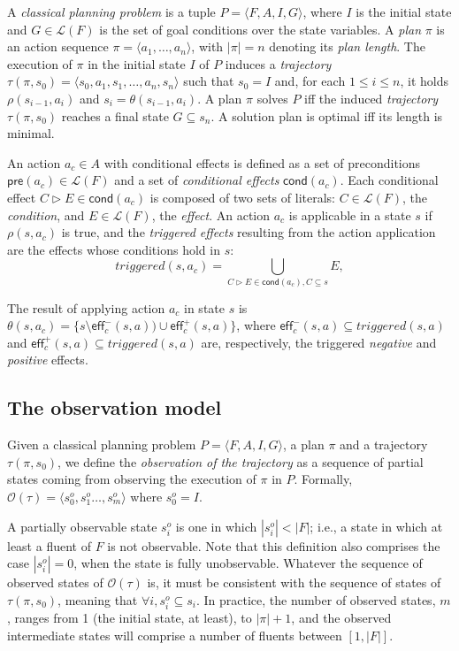 \documentclass{article}
\newcommand{\tup}[1]{{\langle #1 \rangle}}
\newcommand{\pre}{\mathsf{pre}}     %
\newcommand{\eff}{\mathsf{eff}}     %
\newcommand{\cond}{\mathsf{cond}}   %
\begin{document}
A {\em classical planning problem} is a tuple $P=\tup{F,A,I,G}$, where $I$ is the initial state and $G\in\mathcal{L}(F)$ is the set of goal conditions over the state variables. A {\em plan} $\pi$ is an action sequence $\pi=\tup{a_1, \ldots, a_n}$, with $|\pi|=n$ denoting its {\em plan length}. The execution of $\pi$ in the initial state $I$ of $P$ induces a {\em trajectory} $\tau(\pi,s_0)=\tup{s_0, a_1, s_1, \ldots, a_n, s_n}$ such that $s_0=I$ and, for each {\small $1\leq i\leq n$}, it holds $\rho(s_{i-1},a_i)$ and $s_i=\theta(s_{i-1},a_i)$. A plan $\pi$ solves $P$ iff the induced {\em trajectory} $\tau(\pi,s_0)$ reaches a final state $G \subseteq s_n$. A solution plan is optimal iff its length is minimal.

An action $a_c\in A$ with conditional effects is defined as a set of preconditions $\pre(a_c)\in\mathcal{L}(F)$ and a set of {\em conditional effects} $\cond(a_c)$. Each conditional effect $C\rhd E\in\cond(a_c)$ is composed of two sets of literals: $C\in\mathcal{L}(F)$, the {\em condition}, and $E\in\mathcal{L}(F)$, the {\em effect}. An action $a_c$ is applicable in a state $s$ if $\rho(s,a_c)$ is true, and the {\em triggered effects} resulting from the action application are the effects whose conditions hold in $s$:
\[
triggered(s,a_c)=\bigcup_{C\rhd E\in\cond(a_c),C\subseteq s} E,
\]

The result of applying action $a_c$ in state $s$ is $\theta(s,a_c)=\{s\setminus\eff_c^-(s,a))\cup\eff_c^+(s,a)\}$, where $\eff_c^-(s,a)\subseteq triggered(s,a)$ and $\eff_c^+(s,a)\subseteq triggered(s,a)$ are, respectively, the triggered {\em negative} and {\em positive} effects.


\subsection{The observation model}
Given a classical planning problem $P=\tup{F,A,I,G}$, a plan $\pi$ and a trajectory $\tau(\pi,s_0)$, we define the \emph{observation of the trajectory} as a sequence of partial states coming from observing the execution of $\pi$ in $P$. Formally, $\mathcal{O}(\tau)=\tup{s_0^o,s_1^o \ldots , s_m^o}$ where $s_0^o=I$.

A partially observable state $s_i^o$ is one in which $|s_i^o| < |F|$; i.e., a state in which at least a fluent of $F$ is not observable. Note that this definition also comprises the case $|s_i^o| = 0$, when the state is fully unobservable. Whatever the sequence of observed states of $\mathcal{O}(\tau)$ is, it must be consistent with the sequence of states of $\tau(\pi,s_0)$, meaning that $\forall i, s_i^o \subseteq s_i$. In practice, the number of observed states, $m$, ranges from 1 (the initial state, at least), to $|\pi|+1$, and the observed intermediate states will comprise a number of fluents between $[1,|F|]$.
\end{document}

